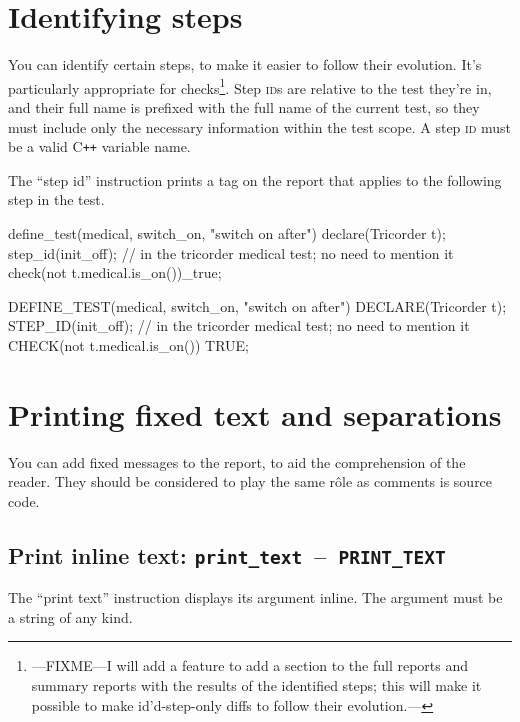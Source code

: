 \documentclass[twoside, a4paper, article]{memoir}
\newcommand*\testudocolor{\color{red!80!blue}}
\newcommand*\testudo[1]{\texttt{\testudocolor{}#1}}
\newcommand*\testudopair[2]{\testudo{#1}~--~\testudo{#2}}
\newcommand*\Cpp{C\texttt{++}}
\begin{document}
\section{Identifying steps}
\label{sec:identifying-steps}

You can identify certain steps, to make it easier to follow their evolution.
It's particularly appropriate for checks\footnote{---FIXME---I will add a
  feature to add a section to the full reports and summary reports with the
  results of the identified steps; this will make it possible to make
  id'd-step-only diffs to follow their evolution.---}.  Step \textsc{id}s are
relative to the test they're in, and their full name is prefixed with the full
name of the current test, so they must include only the necessary information
within the test scope.  A step \textsc{id} must be a valid \Cpp{} variable
name.

The ``step id'' instruction prints a tag on the report that applies to the
following step in the test.
\begin{cpplisting}
define_test(medical, switch_on, "switch on after") {
  declare(Tricorder t);
  step_id(init_off); // in the tricorder medical test; no need to mention it
  check(not t.medical.is_on())_true;
}
\end{cpplisting}

\begin{cpplisting}
DEFINE_TEST(medical, switch_on, "switch on after") {
  DECLARE(Tricorder t);
  STEP_ID(init_off); // in the tricorder medical test; no need to mention it
  CHECK(not t.medical.is_on()) TRUE;
}
\end{cpplisting}


\section{Printing fixed text and separations}
\label{sec:printing-text-separations}

You can add fixed messages to the report, to aid the comprehension of the
reader.  They should be considered to play the same rôle as comments is source
code.

\subsection{Print inline text:
  \testudopair{print\_text}{PRINT\_TEXT}}
\label{sec:print-inline-text}

The ``print text'' instruction displays its argument inline.  The argument must
be a string of any kind.
\end{document}
